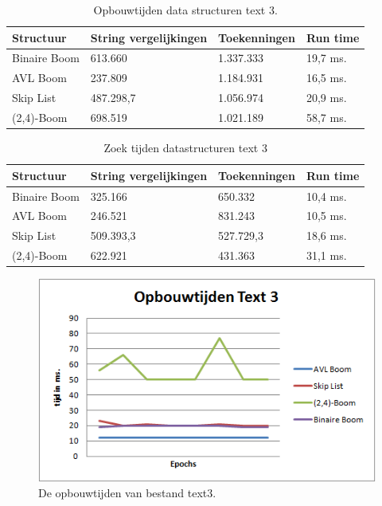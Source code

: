 \begin{table}
\begin{tabularx}{\linewidth}{| l | X| X| X | }
 \hline
 Structuur & String vergelijkingen &  Toekenningen & Run time \\
 \hline
 	Binaire Boom & 613.660 & 1.337.333 & 19,7 ms. \\
 	\hline
 	AVL Boom & 237.809 & 1.184.931 & 16,5  ms. \\
 	\hline
 	Skip List & 487.298,7 & 1.056.974 & 20,9 ms. \\
 	\hline
 	(2,4)-Boom & 698.519 & 1.021.189 & 58,7 ms. \\
 	\hline
\end{tabularx}
\label{tbl_text1_search}
\caption{Opbouwtijden data structuren text 3.}
\end{table}


\begin{table}
\begin{tabularx}{\linewidth}{| l | X| X| X | }
 \hline
 Structuur & String vergelijkingen &  Toekenningen & Run time \\
 \hline
 	Binaire Boom & 325.166 & 650.332 & 10,4 ms. \\
 	\hline
 	AVL Boom & 246.521 & 831.243 & 10,5 ms. \\
 	\hline
 	Skip List & 509.393,3 & 527.729,3 & 18,6 ms. \\
 	\hline
 	(2,4)-Boom & 622.921 & 431.363 & 31,1 ms. \\
 	\hline
\end{tabularx}
\label{tbl_text1_search}
\caption{Zoek tijden datastructuren text 3}
\end{table}

\begin{figure}[h]
	\centering
		\includegraphics[width=\textwidth]{chap7/opbouwtijdtext3}
		\caption{De opbouwtijden van bestand text3.}
	\label{fig:opbouwtext3}
\end{figure}

